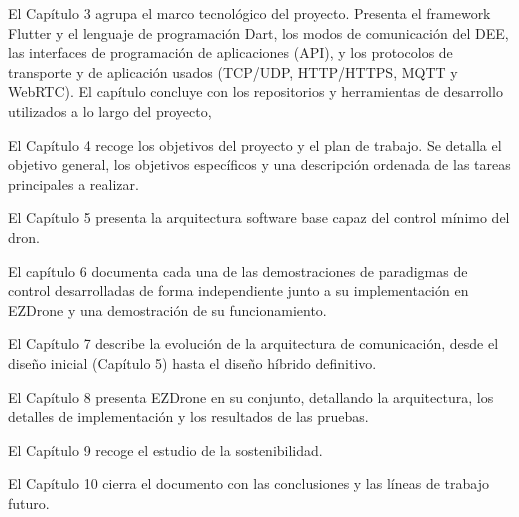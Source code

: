 El Capítulo 3 agrupa el marco tecnológico del proyecto. Presenta el framework Flutter y el lenguaje de programación Dart, los modos de comunicación del DEE, las interfaces de programación de aplicaciones (API), y los protocolos de transporte y de aplicación usados (TCP/UDP, HTTP/HTTPS, MQTT y WebRTC). El capítulo concluye con los repositorios y herramientas de desarrollo utilizados a lo largo del proyecto,

El Capítulo 4 recoge los objetivos del proyecto y el plan de trabajo. Se detalla el objetivo general, los objetivos específicos y una descripción ordenada de las tareas principales a realizar.

El Capítulo 5 presenta la arquitectura software base capaz del control mínimo del dron. 

El capítulo 6 documenta cada una de las demostraciones de paradigmas de control desarrolladas de forma independiente junto a su implementación en EZDrone y una demostración de su funcionamiento. 

El Capítulo 7 describe la evolución de la arquitectura de comunicación, desde el diseño inicial (Capítulo 5) hasta el diseño híbrido definitivo. 

El Capítulo 8 presenta EZDrone en su conjunto, detallando la arquitectura, los detalles de implementación y los resultados de las pruebas. 

El Capítulo 9 recoge el estudio de la sostenibilidad. 

El Capítulo 10 cierra el documento con las conclusiones y las líneas de trabajo futuro.

